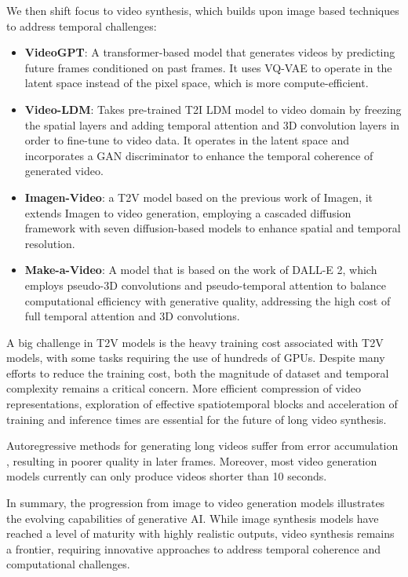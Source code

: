 We then shift focus to video synthesis, which builds upon image based techniques to address temporal challenges:

\begin{itemize}
    \item \textbf{VideoGPT}: A transformer-based model that generates videos by predicting future frames conditioned on past frames. It uses VQ-VAE to operate in the latent space instead of the pixel space, which is more compute-efficient.
    
    \item \textbf{Video-LDM}: Takes pre-trained T2I LDM model to video domain by freezing the spatial layers and adding temporal attention and 3D convolution layers in order to fine-tune to video data. It operates in the latent space and incorporates a GAN discriminator to enhance the temporal coherence of generated video.
    
    \item \textbf{Imagen-Video}: a T2V model based on the previous work of Imagen, it extends Imagen to video generation, employing a cascaded diffusion framework with seven diffusion-based models to enhance spatial and temporal resolution.
    
    \item \textbf{Make-a-Video}: A model that is based on the work of DALL-E 2, which employs pseudo-3D convolutions and pseudo-temporal attention to balance computational efficiency with generative quality, addressing the high cost of full temporal attention and 3D convolutions.
\end{itemize}

A big challenge in T2V models is the heavy training cost associated with T2V models, with some tasks requiring the use of hundreds of GPUs. Despite many efforts to reduce the training cost, both the magnitude of dataset and temporal complexity remains a critical concern. More efficient compression of video representations, exploration of effective spatiotemporal blocks and acceleration of training and inference times are essential for the future of long video synthesis.

Autoregressive methods for generating long videos suffer from error accumulation \cite{ouyang2024flexifilm}, resulting in poorer quality in later frames. Moreover, most video generation models currently can only produce videos shorter than 10 seconds.

In summary, the progression from image to video generation models illustrates the evolving capabilities of generative AI. While image synthesis models have reached a level of maturity with highly realistic outputs, video synthesis remains a frontier, requiring innovative approaches to address temporal coherence and computational challenges.